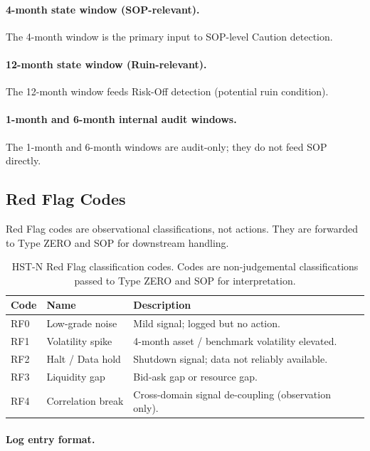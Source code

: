 \paragraph{4-month state window (SOP-relevant).}
The 4-month window is the primary input to SOP-level Caution
detection.

\paragraph{12-month state window (Ruin-relevant).}
The 12-month window feeds Risk-Off detection (potential ruin
condition).

\paragraph{1-month and 6-month internal audit windows.}
The 1-month and 6-month windows are audit-only; they do not feed SOP
directly.

\subsection{Red Flag Codes}
\label{sec:hstn-red-flag-c2}

Red Flag codes are observational classifications, not actions. They
are forwarded to Type ZERO and SOP for downstream handling.

\begin{table}[ht]
\centering
\small
\begin{tabularx}{\linewidth}{llX}
\toprule
\textbf{Code} & \textbf{Name} & \textbf{Description} \\
\midrule
RF0 & Low-grade noise & Mild signal; logged but no action. \\
RF1 & Volatility spike & 4-month asset / benchmark volatility
elevated. \\
RF2 & Halt / Data hold & Shutdown signal; data not reliably
available. \\
RF3 & Liquidity gap & Bid-ask gap or resource gap. \\
RF4 & Correlation break & Cross-domain signal de-coupling
(observation only). \\
\bottomrule
\end{tabularx}
\caption[HST-N Red Flag codes]{HST-N Red Flag classification codes.
Codes are non-judgemental classifications passed to Type ZERO and
SOP for interpretation.}
\label{tab:hstn-red-flag-c2}
\end{table}

\paragraph{Log entry format.}

